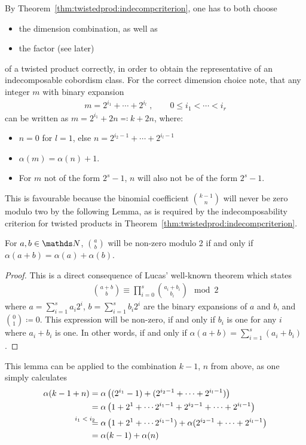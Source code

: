 By Theorem~\ref{thm:twistedprod:indecompcriterion}, one has to
both choose
\begin{itemize}
\item the dimension combination, as well as
\item the factor (see later)
\end{itemize}
of a twisted product correctly, in order to obtain the representative
of an indecomposable cobordism class.
For the correct dimension choice note, that any integer $m$ with
binary expansion
\begin{gather*}
  m=2^{i_1}+\dotsb+2^{i_l}
  \;,\qquad
  0 \leq i_1<\dotsb<i_r
\end{gather*}
can be written as $m=2^{i_1}+2n\eqqcolon k+2n$, where:
\begin{itemize}
\item $n=0$ for $l=1$, else $n=2^{i_2-1}+\dotsb+2^{i_l-1}$
\item $\alpha(m)=\alpha(n)+1$.
\item For $m$ not of the form $2^s-1$, $n$ will also not be of the
  form $2^s-1$.
\end{itemize}
This is favourable because the binomial coefficient
$\binom{k-1}{n}$ will never be zero modulo two by the following Lemma,
as is required by the indecomposability criterion for twisted products
in Theorem~\ref{thm:twistedprod:indecompcriterion}.
\begin{Lem}\label{lem:lucas}
  For $a,b\in\Nat$, $\binom{a}{b}$ will be non-zero modulo 2 if and only
  if $\alpha(a+b)=\alpha(a)+\alpha(b)$.
  \begin{proof}
    This is a direct consequence of Lucas' well-known theorem
    which states
    \begin{gather*}
      \binom{a+b}{b} \equiv \prod_{i=0}^s \binom{a_i+b_i}{b_i} \mod 2
    \end{gather*}
    where $a=\sum_{i=1}^s a_i2^{i}$, $b=\sum_{i=1}^s b_i2^{i}$ are the
    binary expansions of $a$ and $b$, and $\binom{0}{1}\coloneqq 0$.
    This expression will be non-zero, if and only if $b_i$ is one for
    any $i$ where $a_i+b_i$ is one. In other words, if and only if
    $\alpha(a+b)=\sum_{i=1}^s(a_i+b_i)$.    
  \end{proof}
\end{Lem}
This lemma can be applied to the combination $k-1$, $n$ from above, as one
simply calculates
\begin{align*}
  \alpha(k-1+n)
  &= \alpha\left((2^{i_1}-1)+ (2^{i_2-1}+\dotsb+2^{i_l-1})\right) \\
  &= \alpha\left(1+2^1+\dotsb 2^{i_1-1} + 2^{i_2-1}+\dotsb+2^{i_l-1}\right) \\
  &\equalsby{$i_1<i_2$}
    \alpha\left(1+2^1+\dotsb 2^{i_1-1}) + \alpha(2^{i_2-1}+\dotsb+2^{i_l-1}\right)\\
  &= \alpha(k-1) + \alpha(n)
\end{align*}

